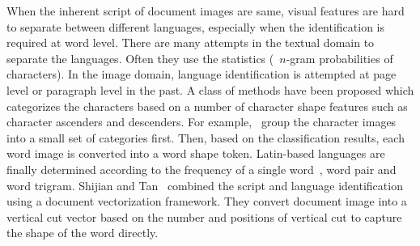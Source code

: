 When the inherent script of document images are same, visual features are hard to separate between different languages, especially when the identification is required at word level. There are many attempts in the textual domain to separate the languages. Often they use the statistics (\eg\ $n$-gram probabilities of characters). In the image domain, language identification is attempted at page level or paragraph level in the past.
A class of methods have been proposed which categorizes the characters based on a number of character shape features such as character ascenders and descenders. For example,~\cite{Spitz97} group the character images into a small set of categories first. Then, based on the classification results, each word image is converted into a word shape token. Latin-based languages are finally determined according to the frequency of a single word~\cite{Spitz97}, word pair and word trigram. Shijian and Tan~\cite{Shijian08}
combined the script and language identification using a document vectorization framework. They convert document image into a vertical cut vector based on the number and positions of vertical cut to capture the shape of the word directly.

